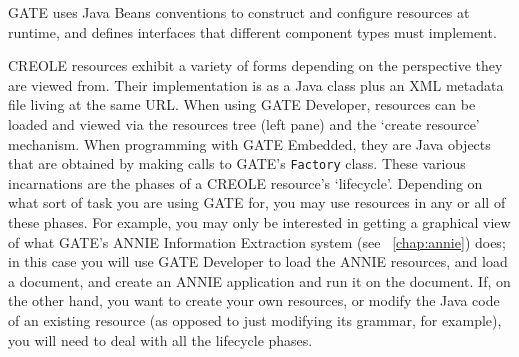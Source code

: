 GATE uses Java Beans conventions to construct and configure resources at
runtime, and defines interfaces that different component types must implement.


CREOLE resources exhibit a variety of forms depending on the perspective they are
viewed from. Their implementation is as a Java class plus an XML metadata file
living at the same URL. When using GATE Developer, resources can be loaded and
viewed via the resources tree (left pane) and the `create resource' mechanism.
When programming with GATE Embedded, they are Java objects that are obtained by
making calls to GATE's {\tt Factory} class. These various incarnations are the
phases of a CREOLE resource's `lifecycle'. Depending on what sort of task you are
using GATE for, you may use resources in any or all of these phases. For example,
you may only be interested in getting a graphical view of what GATE's ANNIE
Information Extraction system (see \Chapthing\ \ref{chap:annie}) does; in this
case you will use GATE Developer to load the ANNIE resources, and load a
document, and create an ANNIE application and run it on the document. If, on the
other hand, you want to create your own resources, or modify the Java code of an
existing resource (as opposed to just modifying its grammar, for example), you
will need to deal with all the lifecycle phases.

